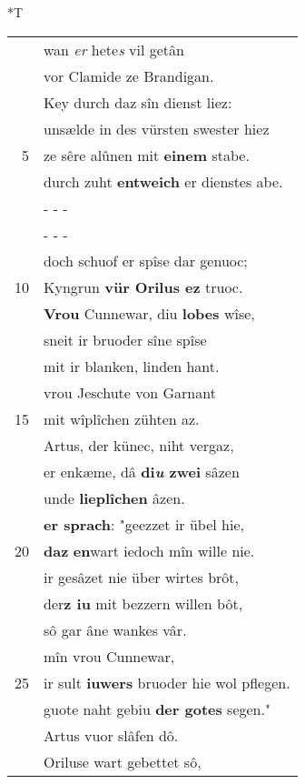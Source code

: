 \documentclass[8pt,a4paper,notitlepage]{article}
\begin{document}
\begin{table}[ht]
\begin{minipage}[t]{0.5\linewidth}
\end{minipage}
\hspace{0.5cm}
\begin{minipage}[t]{0.5\linewidth}
\small
\begin{center}*T
\end{center}
\begin{tabular}{rl}
 & wan \textit{er} hete\textit{s} vil getân\\ 
 & vor Clamide ze Brandigan.\\ 
 & Key durch daz sîn dienst liez:\\ 
 & unsælde in des vürsten swester hiez\\ 
5 & ze sêre alûnen mit \textbf{einem} stabe.\\ 
 & durch zuht \textbf{entweich} er dienstes abe.\\ 
 & \multicolumn{1}{l}{ - - - }\\ 
 & \multicolumn{1}{l}{ - - - }\\ 
 & doch schuof er spîse dar genuoc;\\ 
10 & Kyngrun \textbf{vür Orilus ez} truoc.\\ 
 & \textbf{Vrou} Cunnewar, diu \textbf{lobes} wîse,\\ 
 & sneit ir bruoder sîne spîse\\ 
 & mit ir blanken, linden hant.\\ 
 & vrou Jeschute von Garnant\\ 
15 & mit wîplîchen zühten az.\\ 
 & Artus, der künec, niht vergaz,\\ 
 & er enkæme, dâ \textbf{di\textit{u} zwei} sâzen\\ 
 & unde \textbf{lieplîchen} âzen.\\ 
 & \textbf{er sprach}: "geezzet ir übel hie,\\ 
20 & \textbf{daz} \textbf{en}wart iedoch mîn wille nie.\\ 
 & ir gesâzet nie über wirtes brôt,\\ 
 & der\textbf{z iu} mit bezzern willen bôt,\\ 
 & sô gar âne wankes vâr.\\ 
 & mîn vrou Cunnewar,\\ 
25 & ir sult \textbf{iuwers} bruoder hie wol pflegen.\\ 
 & guote naht gebiu \textbf{der gotes} segen."\\ 
 & Artus vuor slâfen dô.\\ 
 & Oriluse wart gebettet sô,\\ 

\end{tabular}
\end{minipage}
\end{table}
\end{document}
